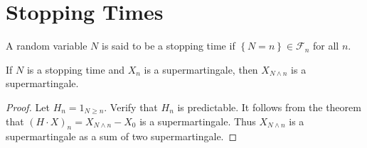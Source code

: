\section{Stopping Times}
\begin{definition}
    A random variable $N$ is said to be a stopping time if $\left\{N=n\right\}\in\mathcal{F}_n$ for all $n$.
\end{definition}
\begin{corollary}
    If $N$ is a stopping time and $X_n$ is a supermartingale, then $X_{N\wedge n}$ is a supermartingale.
\end{corollary}
\begin{proof}
    Let $H_n=1_{N\ge n}$. Verify that $H_n$ is predictable. It follows from the theorem that $(H\cdot X)_n=X_{N\wedge n}-X_0$ is a supermartingale. Thus $X_{N\wedge n}$ is a supermartingale as a sum of two supermartingale.
\end{proof}


